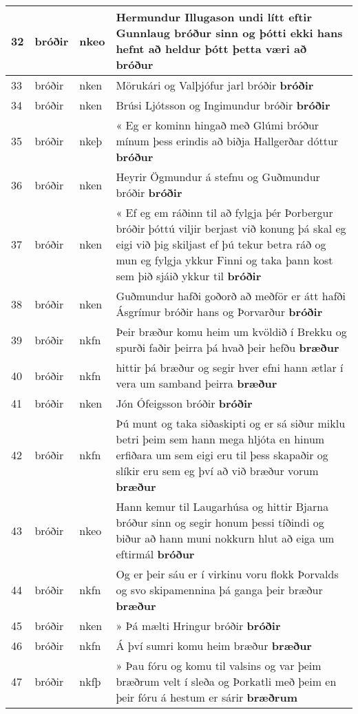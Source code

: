 \documentclass{article}
\begin{document}
\begin{longtable}{p{1cm}|p{1cm}|p{1cm}|p{13cm}}
\hline
32&bróðir&nkeo&Hermundur Illugason undi lítt eftir Gunnlaug bróður sinn og þótti ekki hans hefnt að heldur þótt þetta væri að \textbf{bróður} \\
\hline
33&bróðir&nken&Mörukári og Valþjófur jarl bróðir \textbf{bróðir} \\
\hline
34&bróðir&nken&Brúsi Ljótsson og Ingimundur bróðir \textbf{bróðir} \\
\hline
35&bróðir&nkeþ&« Eg er kominn hingað með Glúmi bróður mínum þess erindis að biðja Hallgerðar dóttur \textbf{bróður} \\
\hline
36&bróðir&nken&Heyrir Ögmundur á stefnu og Guðmundur bróðir \textbf{bróðir} \\
\hline
37&bróðir&nken&« Ef eg em ráðinn til að fylgja þér Þorbergur bróðir þóttú viljir berjast við konung þá skal eg eigi við þig skiljast ef þú tekur betra ráð og mun eg fylgja ykkur Finni og taka þann kost sem þið sjáið ykkur til \textbf{bróðir} \\
\hline
38&bróðir&nken&Guðmundur hafði goðorð að meðför er átt hafði Ásgrímur bróðir hans og Þorvarður \textbf{bróðir} \\
\hline
39&bróðir&nkfn&Þeir bræður komu heim um kvöldið í Brekku og spurði faðir þeirra þá hvað þeir hefðu \textbf{bræður} \\
\hline
40&bróðir&nkfn&hittir þá bræður og segir hver efni hann ætlar í vera um samband þeirra \textbf{bræður} \\
\hline
41&bróðir&nken&Jón Ófeigsson bróðir \textbf{bróðir} \\
\hline
42&bróðir&nkfn&Þú munt og taka siðaskipti og er sá siður miklu betri þeim sem hann mega hljóta en hinum erfiðara um sem eigi eru til þess skapaðir og slíkir eru sem eg því að við bræður vorum \textbf{bræður} \\
\hline
43&bróðir&nkeo&Hann kemur til Laugarhúsa og hittir Bjarna bróður sinn og segir honum þessi tíðindi og biður að hann muni nokkurn hlut að eiga um eftirmál \textbf{bróður} \\
\hline
44&bróðir&nkfn&Og er þeir sáu er í virkinu voru flokk Þorvalds og svo skipamennina þá ganga þeir bræður \textbf{bræður} \\
\hline
45&bróðir&nken&» Þá mælti Hringur bróðir \textbf{bróðir} \\
\hline
46&bróðir&nkfn&Á því sumri komu heim bræður \textbf{bræður} \\
\hline
47&bróðir&nkfþ&» Þau fóru og komu til valsins og var þeim bræðrum velt í sleða og Þorkatli með þeim en þeir fóru á hestum er sárir \textbf{bræðrum} \\

\end{longtable}
\end{document}
